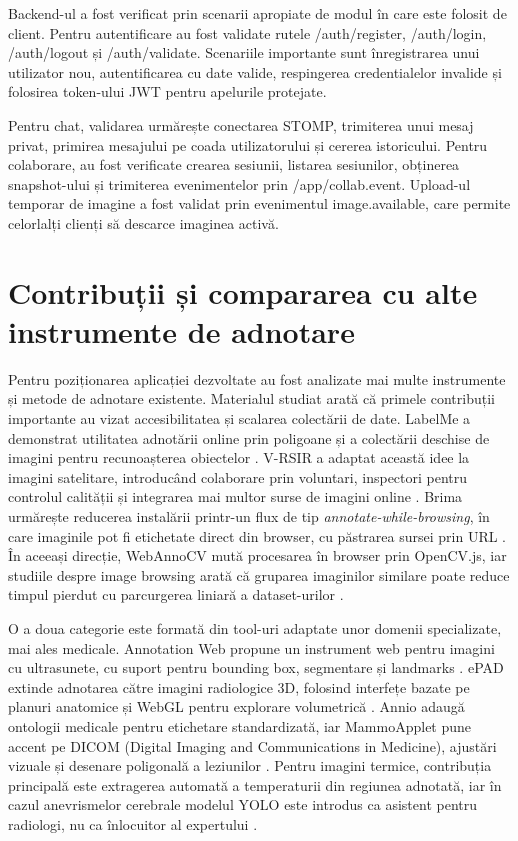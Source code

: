 Backend-ul a fost verificat prin scenarii apropiate de modul în care este folosit de client. Pentru autentificare au fost validate rutele /auth/register, /auth/login, /auth/logout și /auth/validate. Scenariile importante sunt înregistrarea unui utilizator nou, autentificarea cu date valide, respingerea credentialelor invalide și folosirea token-ului JWT pentru apelurile protejate.

Pentru chat, validarea urmărește conectarea STOMP, trimiterea unui mesaj privat, primirea mesajului pe coada utilizatorului și cererea istoricului. Pentru colaborare, au fost verificate crearea sesiunii, listarea sesiunilor, obținerea snapshot-ului și trimiterea evenimentelor prin /app/collab.event. Upload-ul temporar de imagine a fost validat prin evenimentul image.available, care permite celorlalți clienți să descarce imaginea activă.

\section{Contribuții și compararea cu alte instrumente de adnotare}

Pentru poziționarea aplicației dezvoltate au fost analizate mai multe instrumente și metode de adnotare existente. Materialul studiat arată că primele contribuții importante au vizat accesibilitatea și scalarea colectării de date. LabelMe a demonstrat utilitatea adnotării online prin poligoane și a colectării deschise de imagini pentru recunoașterea obiectelor \cite{5483185}. V-RSIR a adaptat această idee la imagini satelitare, introducând colaborare prin voluntari, inspectori pentru controlul calității și integrarea mai multor surse de imagini online \cite{8746238}. Brima urmărește reducerea instalării printr-un flux de tip \textit{annotate-while-browsing}, în care imaginile pot fi etichetate direct din browser, cu păstrarea sursei prin URL \cite{9506683}. În aceeași direcție, WebAnnoCV mută procesarea în browser prin OpenCV.js, iar studiile despre image browsing arată că gruparea imaginilor similare poate reduce timpul pierdut cu parcurgerea liniară a dataset-urilor \cite{11099761,5606101}.

O a doua categorie este formată din tool-uri adaptate unor domenii specializate, mai ales medicale. Annotation Web propune un instrument web pentru imagini cu ultrasunete, cu suport pentru bounding box, segmentare și landmarks \cite{9593336}. ePAD extinde adnotarea către imagini radiologice 3D, folosind interfețe bazate pe planuri anatomice și WebGL pentru explorare volumetrică \cite{7167466}. Annio adaugă ontologii medicale pentru etichetare standardizată, iar MammoApplet pune accent pe DICOM (Digital Imaging and Communications in Medicine), ajustări vizuale și desenare poligonală a leziunilor \cite{10.1109/HISB.2012.72,6399703}. Pentru imagini termice, contribuția principală este extragerea automată a temperaturii din regiunea adnotată, iar în cazul anevrismelor cerebrale modelul YOLO este introdus ca asistent pentru radiologi, nu ca înlocuitor al expertului \cite{10053084,11008399}.

